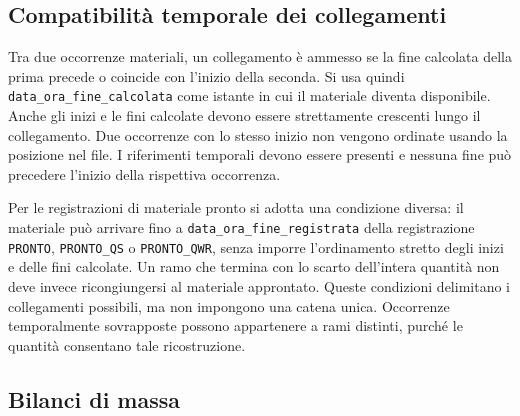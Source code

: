 \subsection{Compatibilità temporale dei collegamenti}
\label{sec:flow-temporal-compatibility}


Tra due occorrenze materiali, un collegamento è ammesso se la fine calcolata della prima precede o coincide con l'inizio della seconda. Si usa quindi \texttt{data\_ora\_fine\_calcolata} come istante in cui il materiale diventa disponibile. Anche gli inizi e le fini calcolate devono essere strettamente crescenti lungo il collegamento. Due occorrenze con lo stesso inizio non vengono ordinate usando la posizione nel file. I riferimenti temporali devono essere presenti e nessuna fine può precedere l'inizio della rispettiva occorrenza.

Per le registrazioni di materiale pronto si adotta una condizione diversa: il materiale può arrivare fino a \texttt{data\_ora\_fine\_registrata} della registrazione \texttt{PRONTO}, \texttt{PRONTO\_QS} o \texttt{PRONTO\_QWR}, senza imporre l'ordinamento stretto degli inizi e delle fini calcolate. Un ramo che termina con lo scarto dell'intera quantità non deve invece ricongiungersi al materiale approntato. Queste condizioni delimitano i collegamenti possibili, ma non impongono una catena unica. Occorrenze temporalmente sovrapposte possono appartenere a rami distinti, purché le quantità consentano tale ricostruzione.

\subsection{Bilanci di massa}
\label{sec:flow-mass-balances}

